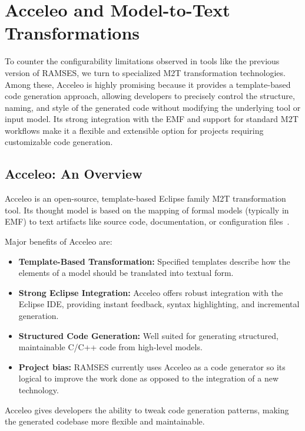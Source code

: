\section{Acceleo and Model-to-Text Transformations} \label{sec:folders_and_files}

To counter the configurability limitations observed in tools like the previous version of \gls{RAMSES}, we turn to specialized \gls{M2T} transformation technologies. Among these, Acceleo is highly promising because it provides a template-based code generation approach, allowing developers to precisely control the structure, naming, and style of the generated code without modifying the underlying tool or input model. Its strong integration with the \gls{EMF} and support for standard \gls{M2T} workflows make it a flexible and extensible option for projects requiring customizable code generation.

\subsection{Acceleo: An Overview} 
\label{sec:overview}

Acceleo is an open-source, template-based Eclipse family \gls{M2T} transformation tool. Its thought model is based on the mapping of formal models (typically in \gls{EMF}) to text artifacts like source code, documentation, or configuration files~\cite{AcceleoUserGuide}.

Major benefits of Acceleo are: 
\begin{itemize} 
	\item \textbf{Template-Based Transformation:} Specified templates describe how the elements of a model should be translated into textual form.
	\item \textbf{Strong Eclipse Integration:} Acceleo offers robust integration with the Eclipse IDE, providing instant feedback, syntax highlighting, and incremental generation.
	\item \textbf{Structured Code Generation:} Well suited for generating structured, maintainable C/C++ code from high-level models.
	\item \textbf{Project bias:} \gls{RAMSES} currently uses Acceleo as a code generator so its logical to improve the work done as opposed to the integration of a new technology.
\end{itemize}

\begin{tcolorbox}[colback=green!5, colframe=green!40!black] Acceleo gives developers the ability to tweak code generation patterns, making the generated codebase more flexible and maintainable. \end{tcolorbox}

